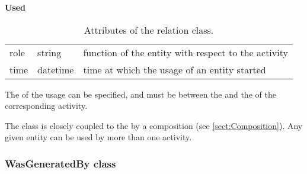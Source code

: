 \begin{table}[ht]
\small
{}\textwidth
\textbf{\normalsize Used}\vspace{0.25em}\\
\begin{tabulary}{1.0\textwidth}{llL}
\toprule
{} &  & \\
\midrule
role  & string   & function of the entity with respect to the activity\\
time  & datetime & time at which the usage of an entity started\\
\bottomrule
\end{tabulary}
\caption[Attributes of the  relation class]{Attributes of the  relation class.}
\label{tab:used}
\end{table}

The  of the usage can be specified, and must be between the  and the  of the corresponding activity.

The  class is closely coupled to the  by a composition (see \ref{sect:Composition}). 
Any given entity can be used by more than one activity.


\subsubsection{WasGeneratedBy class}

